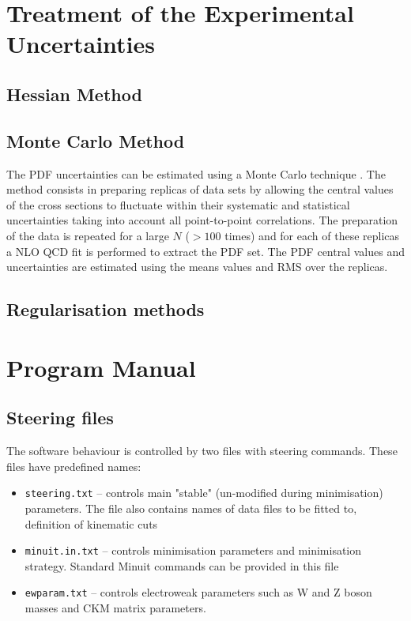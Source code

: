 \documentclass[11pt,a4paper]{article}
\begin{document}


\section{Treatment of the Experimental Uncertainties}
\subsection{Hessian Method}

\subsection{Monte Carlo Method}


The PDF uncertainties can be estimated using a Monte Carlo technique \cite{mcmethod}.
The method consists in preparing replicas of data sets by allowing the central values of the cross sections to 
fluctuate within their systematic and statistical uncertainties taking into account all point-to-point correlations.
The preparation of the data is repeated for a large $N$ ($>100$ times) and for each of these replicas a NLO QCD fit is performed to 
extract the PDF set. The PDF central values and uncertainties are estimated using the means values and RMS 
over the replicas. 



\subsection{Regularisation methods}


\section{Program Manual}
\label{sec:man}
\subsection{Steering files}
    The software behaviour is controlled by two files with steering commands.
    These files have predefined names:
    \begin{itemize}
      \item {\tt steering.txt}  --   controls main "stable" (un-modified during 
                         minimisation) parameters. The file also contains
                         names of data files to be fitted to, definition 
                         of kinematic cuts                              
      \item {\tt minuit.in.txt}
                   --  controls minimisation parameters and minimisation 
                         strategy. Standard Minuit commands can be provided
                         in this file
      \item {\tt ewparam.txt}    --  controls electroweak parameters such
         as W and Z boson masses and CKM matrix parameters.
    \end{itemize}
\end{document}
